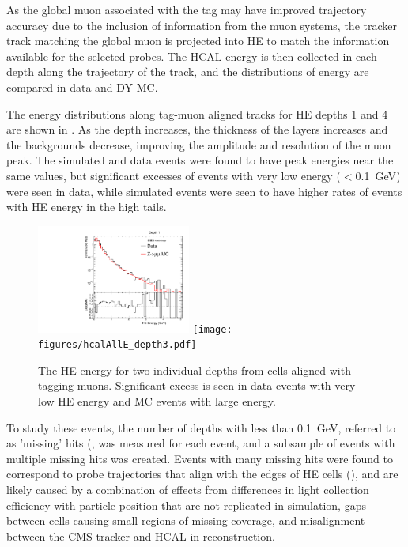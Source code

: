 As the global muon associated with the tag may have improved trajectory accuracy due to the inclusion of information from the muon systems, the tracker track matching the global muon is projected into HE to match the information available for the selected probes.
The HCAL energy is then collected in each depth along the trajectory of the track, and the distributions of energy are compared in data and DY MC.

The energy distributions along tag-muon aligned tracks for HE depths 1 and 4 are shown in .
As the depth increases, the thickness of the layers increases and the backgrounds decrease, improving the amplitude and resolution of the muon peak.
The simulated and data events were found to have peak energies near the same values, but significant excesses of events with very low energy ($<$\SI{0.1}{\giga\eV}) were seen in data, while simulated events were seen to have higher rates of events with HE energy in the high tails.

\begin{figure}[htbp]
	\centering
	\includegraphics[width=0.45\textwidth]{figures/hcalAllE_depth0.pdf}
        \hspace{0.01\textwidth}
        \texttt{[image: figures/hcalAllE\_depth3.pdf]}
        \caption[HE Energy Deposits Along Tag-Aligned Muons]{The HE energy for two individual depths from cells aligned with tagging muons. Significant excess is seen in data events with very low HE energy and MC events with large energy.}
        \label{fig:unCorrHEDepths}
\end{figure}

To study these events, the number of depths with less than \SI{0.1}{\giga\eV}, referred to as 'missing' hits (, was measured for each event, and a subsample of events with multiple missing hits was created. 
Events with many missing hits were found to correspond to probe trajectories that align with the edges of HE cells (), and are likely caused by a combination of effects from differences in light collection efficiency with particle position that are not replicated in simulation, gaps between cells causing small regions of missing coverage, and misalignment between the CMS tracker and HCAL in reconstruction.

